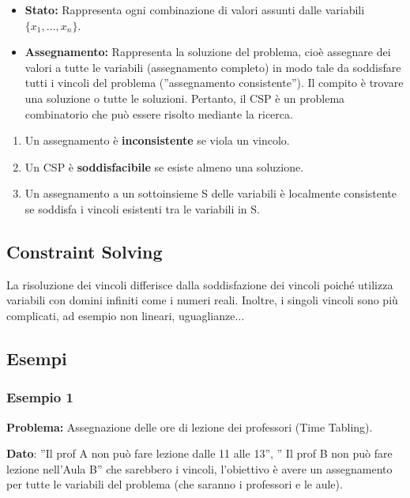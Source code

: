 \begin{itemize}
    \item \textbf{Stato:} Rappresenta ogni combinazione di valori assunti dalle
          variabili $\{x_1, \ldots, x_n\}$.
    \item \textbf{Assegnamento:} Rappresenta la soluzione del problema, cioè
          assegnare dei valori a tutte le variabili (assegnamento completo) in modo
          tale da soddisfare tutti i vincoli del problema (”assegnamento
          consistente”). Il compito è trovare una soluzione o tutte le soluzioni.
          Pertanto, il CSP è un problema combinatorio che può essere risolto mediante
          la ricerca.
\end{itemize}
\begin{enumerate}
    \item Un assegnamento è \textbf{inconsistente} se viola un vincolo.
    \item Un CSP è \textbf{soddisfacibile} se esiste almeno una soluzione.
    \item Un assegnamento a un sottoinsieme S delle variabili è localmente
          consistente se soddisfa i vincoli esistenti tra le variabili in S.
\end{enumerate}

\subsection{Constraint Solving}
La risoluzione dei vincoli differisce dalla soddisfazione dei vincoli poiché
utilizza variabili con domini infiniti come i numeri reali. Inoltre, i singoli
vincoli sono più complicati, ad esempio non lineari, uguaglianze...
\subsection{Esempi}
\subsubsection{Esempio 1}
\textbf{Problema:} Assegnazione delle ore di lezione dei professori (Time
Tabling).

\vspace{0.2cm}

\noindent \textbf{Dato}: ”Il prof A non può fare lezione dalle 11 alle 13”, ” Il
prof B non può fare lezione nell'Aula B” che sarebbero i vincoli, l'obiettivo è
avere un assegnamento per tutte le variabili del problema (che saranno i
professori e le aule).
\vspace{0.2cm}

